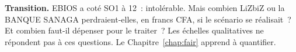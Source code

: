 \begin{boxinfo}
\textbf{Transition.} EBIOS a coté SO1 à 12~: intolérable. Mais combien
LiZbiZ ou la BANQUE SANAGA perdraient-elles, en francs CFA, si le scénario
se réalisait~? Et combien faut-il dépenser pour le traiter~? Les échelles
qualitatives ne répondent pas à ces questions. Le Chapitre~\ref{chap:fair}
apprend à quantifier.
\end{boxinfo}
